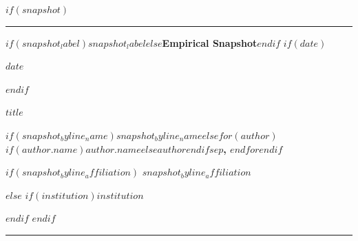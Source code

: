 \documentclass[12pt]{article}
\newif\ifdocdesigneranon
\begin{document}
\newcommand{\docdesignercompacttitle}[1]{%
{\large\bfseries\raggedright #1\par}%
}

$if(snapshot)$
\thispagestyle{empty}
\begingroup
\setlength{\parindent}{0pt}
\setlength{\parskip}{0pt}
\singlespacing
\footnotesize
\noindent\textcolor{docdesigneraccent}{\rule{\textwidth}{2.2pt}}\par
\vspace{0.45em}

\noindent
\begin{minipage}[t]{\textwidth}
\vspace{0pt}
{\small\sffamily\bfseries\color{docdesigneraccent}$if(snapshot_label)$$snapshot_label$$else$Empirical Snapshot$endif$}\hfill
$if(date)$
\ifdocdesigneranon\else
{\small $date$}%
\fi
$endif$
\par\vspace{0.35em}

\docdesignercompacttitle{$title$}
\vspace{0.3em}
{\scriptsize\bfseries
$if(snapshot_byline_name)$$snapshot_byline_name$$else$$for(author)$$if(author.name)$$author.name$$else$$author$$endif$$sep$, $endfor$$endif$%
}\par
$if(snapshot_byline_affiliation)$
{\scriptsize $snapshot_byline_affiliation$}\par
$else$
$if(institution)${\scriptsize $institution$}\par$endif$
$endif$
\end{minipage}\hfill
\par

\vspace{0.55em}
\noindent\textcolor{docdesignerrule}{\rule{\textwidth}{0.7pt}}\par
\vspace{0.55em}
\end{document}
